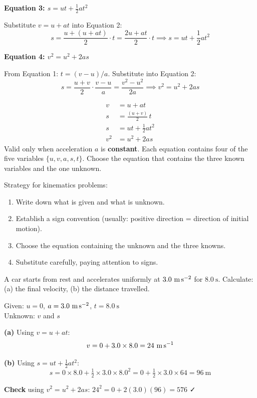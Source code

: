 \textbf{Equation 3: $s = ut + \frac{1}{2}at^2$}

Substitute $v = u + at$ into Equation 2:
\[
  s = \frac{u + (u+at)}{2}\cdot t
  = \frac{2u + at}{2}\cdot t
  \implies \boxed{s = ut + \frac{1}{2}at^2}
\]

\textbf{Equation 4: $v^2 = u^2 + 2as$}

From Equation 1: $t = (v-u)/a$. Substitute into
Equation 2:
\[
  s = \frac{u+v}{2} \cdot \frac{v-u}{a}
  = \frac{v^2 - u^2}{2a}
  \implies \boxed{v^2 = u^2 + 2as}
\]

\begin{lawbox}
\begin{align}
  v &= u + at \label{eq:v}\\[4pt]
  s &= \frac{(u+v)}{2}\,t \label{eq:s_avg}\\[4pt]
  s &= ut + \tfrac{1}{2}at^2 \label{eq:s_quad}\\[4pt]
  v^2 &= u^2 + 2as \label{eq:v_sq}
\end{align}
Valid only when acceleration $a$ is \textbf{constant}.
Each equation contains four of the five variables
$\{u, v, a, s, t\}$. Choose the equation that contains
the three known variables and the one unknown.
\end{lawbox}

\vspace{3.3cm}

\begin{examtipbox}
Strategy for kinematics problems:
\begin{enumerate}[noitemsep]
  \item Write down what is given and what is unknown.
  \item Establish a sign convention (usually: positive
  direction = direction of initial motion).
  \item Choose the equation containing the unknown and
  the three knowns.
  \item Substitute carefully, paying attention to signs.
\end{enumerate}
\end{examtipbox}

\begin{examplebox}[3.1]
A car starts from rest and accelerates uniformly at
$3.0\ \text{m\,s}^{-2}$ for $8.0\ \text{s}$.
Calculate: (a) the final velocity, (b) the distance
travelled.
\end{examplebox}

\begin{solutionbox}
Given: $u = 0$, $a = 3.0\ \text{m\,s}^{-2}$,
$t = 8.0\ \text{s}$\\
Unknown: $v$ and $s$

\textbf{(a)} Using $v = u + at$:
\[
  v = 0 + 3.0 \times 8.0 = 24\ \text{m\,s}^{-1}
\]

\textbf{(b)} Using $s = ut + \frac{1}{2}at^2$:
\[
  s = 0 \times 8.0 + \tfrac{1}{2} \times 3.0 \times 8.0^2
  = 0 + \tfrac{1}{2} \times 3.0 \times 64
  = 96\ \text{m}
\]

\textbf{Check} using $v^2 = u^2 + 2as$:
$24^2 = 0 + 2(3.0)(96) = 576$ ✓
\end{solutionbox}

